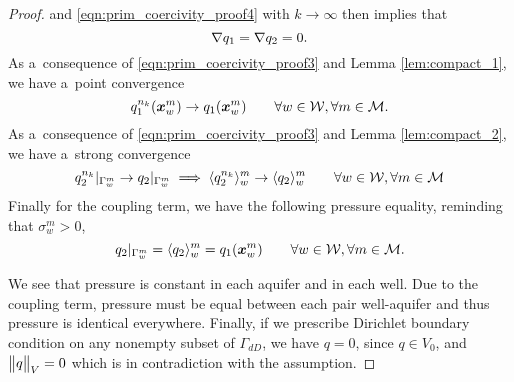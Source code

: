 \begin{proof}
and \eqref{eqn:prim_coercivity_proof4} with $k\rightarrow\infty$ then implies that
\begin{equation}
    \nabla q_1 = \nabla q_2 = 0.
\end{equation}
As a~consequence of \eqref{eqn:prim_coercivity_proof3} and Lemma \ref{lem:compact_1}, we have a~point convergence
\begin{equation} \label{eqn:prim_coercivity_proof6}
    q^{n_k}_1(\mathbf{\boldsymbol{x}}^m_w) \rightarrow q_1(\mathbf{\boldsymbol{x}}^m_w)
    \qquad \forall w\in\mathcal{W}, \forall m\in\mathcal{M}.
\end{equation}
As a~consequence of \eqref{eqn:prim_coercivity_proof3} and Lemma \ref{lem:compact_2}, we have a~strong convergence
\begin{equation} \label{eqn:prim_coercivity_proof5}
    q^{n_k}_2|_{\Gamma^m_w} \rightarrow q_2|_{\Gamma^m_w} \implies \langle q^{n_k}_2\rangle^m_w \rightarrow \langle q_2\rangle^m_w
    \qquad \forall w\in\mathcal{W}, \forall m\in\mathcal{M}
\end{equation}
Finally for the coupling term, we have the following pressure equality, reminding that $\sigma^m_w>0$,
\begin{equation} \label{eqn:prim_coercivity_proof5}
    q_2|_{\Gamma^m_w} = \langle q_2\rangle^m_w = q_1(\mathbf{\boldsymbol{x}}^m_w)
    \qquad \forall w\in\mathcal{W}, \forall m\in\mathcal{M}.
\end{equation}

We see that pressure is constant in each aquifer and in each well.
Due to the coupling term, pressure must be equal between each pair well-aquifer and thus pressure is identical everywhere.
Finally, if we prescribe Dirichlet boundary condition on any nonempty subset of $\Gamma_{dD}$, we have $q=0$, since $q\in V_0$,
and $\bigl\Vert q\bigr\Vert_V=0$ which is in contradiction with the assumption.
\end{proof}


